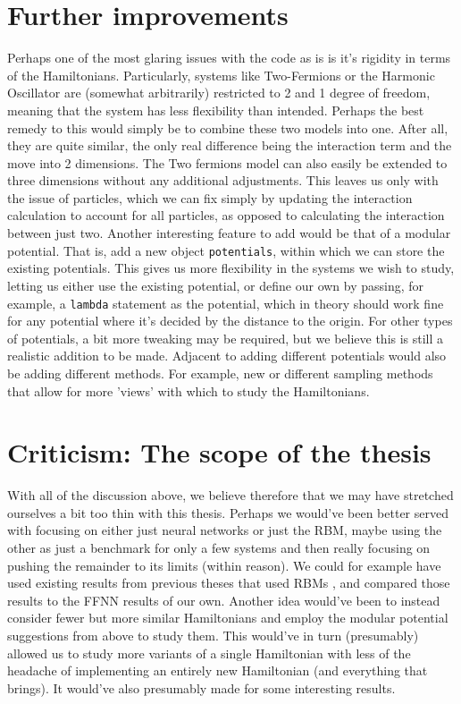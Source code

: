 \documentclass[12pt]{article}
\begin{document}
{\section{Further improvements}
Perhaps one of the most glaring issues with the code as is is it's rigidity in terms of the Hamiltonians. Particularly, systems like Two-Fermions or the Harmonic Oscillator are (somewhat arbitrarily) restricted to 2 and 1 degree of freedom, meaning that the system has less flexibility than intended. \newline
Perhaps the best remedy to this would simply be to combine these two models into one. After all, they are quite similar, the only real difference being the interaction term and the move into 2 dimensions. The Two fermions model can also easily be extended to three dimensions without any additional adjustments. This leaves us only with the issue of particles, which we can fix simply by updating the interaction calculation to account for all particles, as opposed to calculating the interaction between just two. 
\newline
Another interesting feature to add would be that of a modular potential. That is, add a new object \texttt{potentials}, within which we can store the existing potentials. This gives us more flexibility in the systems we wish to study, letting us either use the existing potential, or define our own by passing, for example, a \texttt{lambda} statement as the potential, which in theory should work fine for any potential where it's decided by the distance to the origin. For other types of potentials, a bit more tweaking may be required, but we believe this is still a realistic addition to be made.
\newline
Adjacent to adding different potentials would also be adding different methods. For example, new or different sampling methods that allow for more 'views' with which to study the Hamiltonians.
\section{Criticism: The scope of the thesis}
With all of the discussion above, we believe therefore that we may have stretched ourselves a bit too thin with this thesis. Perhaps we would've been better served with focusing on either just neural networks or just the RBM, maybe using the other as just a benchmark for only a few systems and then really focusing on pushing the remainder to its limits (within reason). We could for example have used existing results from previous theses that used RBMs \cite{flugsrud} \cite{nordhagen}, and compared those results to the FFNN results of our own. \newline
Another idea would've been to instead consider fewer but more similar Hamiltonians and employ the modular potential suggestions from above to study them. This would've in turn (presumably) allowed us to study more variants of a single Hamiltonian with less of the headache of implementing an entirely new Hamiltonian (and everything that brings). It would've also presumably made for some interesting results.
\newpage
~\newpage
}
\end{document}
